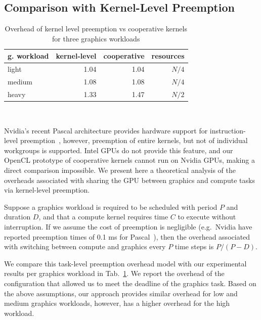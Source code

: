 \documentclass[sigconf]{acmart}
\newcommand{\mytab}{Tab.~}
\begin{document}
{\subsection{Comparison with Kernel-Level Preemption}\label{sec:nvidiacomparison}

\begin{table}[t]
\normalsize
\caption{Overhead of kernel level preemption vs cooperative kernels for three
graphics workloads}

\centering
\begin{tabular}{ l r r r}
g. workload &  kernel-level  & cooperative & resources \\
\hline
light & 1.04 & 1.04 & $N/4$\\
medium & 1.08 & 1.08 & $N/4$\\
heavy & 1.33 & 1.47 & $N/2$\\
\end{tabular} \\

\label{tab:preemption}
\end{table}

Nvidia's recent Pascal architecture provides hardware support for
instruction-level preemption~\cite{PascalWhitepaper,anandtech},
however, preemption of entire kernels, but not of individual
workgroups is supported.  Intel GPUs do not provide this feature, and
our OpenCL prototype of cooperative kernels cannot run on Nvidia GPUs,
making a direct comparison impossible.  We present here a theoretical
analysis of the overheads associated with sharing the GPU between
graphics and compute tasks via kernel-level preemption.

Suppose a graphics workload is required to be scheduled with period
$P$ and duration $D$, and that a compute kernel requires time $C$ to
execute without interruption.  If we assume the cost of preemption is
negligible (e.g.\ Nvidia have reported preemption times of 0.1 ms for
Pascal~\cite{anandtech}), then the overhead associated with switching
between compute and graphics every $P$ time steps is $P/(P-D)$.

We compare this task-level preemption overhead model with our
experimental results per graphics workload in
\mytab{\ref{tab:preemption}}. We report the overhead of the
configuration that allowed us to meet the deadline of the graphics
task.
%
Based on the above assumptions, our approach provides similar overhead
for low and medium graphics workloads, however, has a higher overhead for
the high workload.

}
\end{document}
